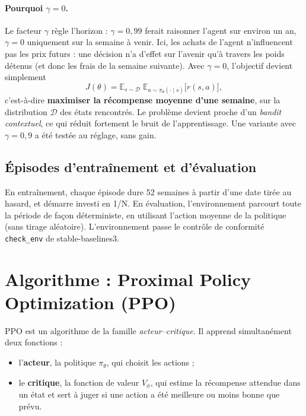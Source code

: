 \documentclass[11pt,a4paper]{article}
\newcommand{\E}{\mathbb{E}}
\begin{document}
\paragraph{Pourquoi \(\gamma=0\).} Le facteur \(\gamma\) règle l'horizon : \(\gamma=0{,}99\) ferait raisonner l'agent
sur environ un an, \(\gamma=0\) uniquement sur la semaine à venir. Ici, les achats de l'agent n'influencent pas les
prix futurs : une décision n'a d'effet sur l'avenir qu'à travers les poids détenus (et donc les frais de la semaine
suivante). Avec \(\gamma=0\), l'objectif devient simplement
\begin{equation}
  J(\theta)=\E_{s\sim\mathcal D}\;\E_{a\sim\pi_\theta(\cdot\mid s)}\big[r(s,a)\big],
\end{equation}
c'est-à-dire \textbf{maximiser la récompense moyenne d'une semaine}, sur la distribution \(\mathcal D\) des états
rencontrés. Le problème devient proche d'un \emph{bandit contextuel}, ce qui réduit fortement le bruit de
l'apprentissage. Une variante avec \(\gamma=0{,}9\) a été testée au réglage, sans gain.

\subsection{Épisodes d'entraînement et d'évaluation}
En entraînement, chaque épisode dure 52 semaines à partir d'une date tirée au hasard, et démarre investi en 1/N.
En évaluation, l'environnement parcourt toute la période de façon déterministe, en utilisant l'action moyenne de
la politique (sans tirage aléatoire). L'environnement passe le contrôle de conformité \texttt{check\_env} de
stable-baselines3.

\section{Algorithme : Proximal Policy Optimization (PPO)}\label{sec:ppo}

PPO \cite{schulman2017ppo} est un algorithme de la famille \emph{acteur--critique}. Il apprend simultanément deux
fonctions :
\begin{itemize}
  \item l'\textbf{acteur}, la politique \(\pi_\theta\), qui choisit les actions ;
  \item le \textbf{critique}, la fonction de valeur \(V_\phi\), qui estime la récompense attendue dans un état et sert
        à juger si une action a été meilleure ou moins bonne que prévu.
\end{itemize}
\end{document}
